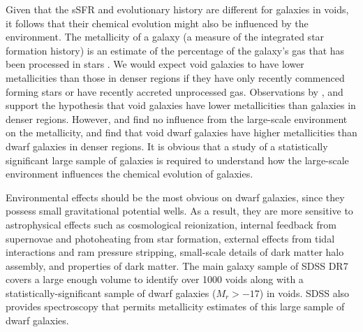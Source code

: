 Given that the sSFR and evolutionary history are different for galaxies in 
voids, it follows that their chemical evolution might also be influenced by the 
environment.  The metallicity of a galaxy (a measure of the integrated star 
formation history) is an estimate of the percentage of the galaxy's gas that has 
been processed in stars \citep{Guseva09}.  We would expect void galaxies to have 
lower metallicities than those in denser regions if they have only recently 
commenced forming stars or have recently accreted unprocessed gas.  Observations 
by \cite{Cooper08,Deng11,Filho15,Pustilnik06,Pustilnik11a,Pustilnik11b,
Pustilnik13,Pustilnik14}, and \cite{Pilyugin17} support the hypothesis that void 
galaxies have lower metallicities than galaxies in denser regions.  However, 
\cite{Kreckel15} and \cite{Douglass17a} find no influence from the large-scale 
environment on the metallicity, and \cite{Douglass17b} find that void dwarf 
galaxies have higher metallicities than dwarf galaxies in denser regions.  It is 
obvious that a study of a statistically significant large sample of galaxies is 
required to understand how the large-scale environment influences the chemical 
evolution of galaxies.

Environmental effects should be the most obvious on dwarf galaxies, since they 
possess small gravitational potential wells.  As a result, they are more 
sensitive to astrophysical effects such as cosmological reionization, internal 
feedback from supernovae and photoheating from star formation, external effects 
from tidal interactions and ram pressure stripping, small-scale details of dark 
matter halo assembly, and properties of dark matter.  The main galaxy sample of 
SDSS DR7 covers a large enough volume to identify over 1000 voids \citep{Pan12} 
along with a statistically-significant sample of dwarf galaxies ($M_r > -17$) in 
voids.  SDSS also provides spectroscopy that permits metallicity estimates of 
this large sample of dwarf galaxies.

